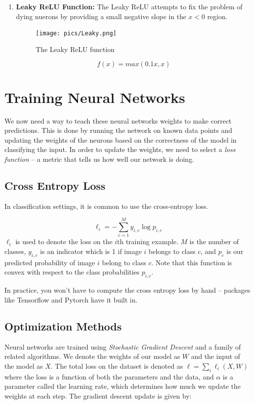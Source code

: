 \documentclass[twoside]{article}
\begin{document}
\begin{enumerate}
\item \textbf{Leaky ReLU Function:}
The Leaky ReLU attempts to fix the problem of dying nuerons by providing a small negative slope in the $x<0$ region.
\begin{figure}[!htb]
\centering
\texttt{[image: pics/Leaky.png]}
\caption{The Leaky ReLU function\cite{cs231n-website}}
\label{fig:ReLU}
\end{figure}
\begin{equation*}
f(x) = max( 0.1 x, x )
\end{equation*}

\end{enumerate}
\section{Training Neural Networks}
We now need a way to teach these neural networks weights to make correct predictions. This is done by running the network on known data points and updating the weights of the neurons based on the correctness of the model in classifying the input. In order to update the weights, we need to select a \textit{loss function} -- a metric that tells us how well our network is doing. \\

\subsection{Cross Entropy Loss}
In classification settings, it is common to use the cross-entropy loss.

\begin{equation}
	\ell_i = -\sum_{c=1}^M y_{i,c} \log p_{i,c} 
\end{equation}
$\ell_i$ is used to denote the loss on the $i$th training example. $M$ is the number of classes, $y_{i,c}$ is an indicator which is 1 if image $i$ belongs to class $c$, and $p_c$ is our predicted probability of image $i$ belong to class $c$. Note that this function is convex with respect to the class probabilities $p_{i,c}$.

In practice, you won't have to compute the cross entropy loss by hand -- packages like Tensorflow and Pytorch have it built in.

\subsection{Optimization Methods}
Neural networks are trained using \emph{Stochastic Gradient Descent} and a family of related algorithms. We denote the weights of our model as $W$ and the input of the model as $X$. The total loss on the dataset is denoted as $\ell= \sum_i \ell_i(X,W)$ where the loss is a function of both the parameters and the data, and $\alpha$ is a parameter called the learning rate, which determines how much we update the weights at each step. The gradient descent update is given by:
\end{document}
